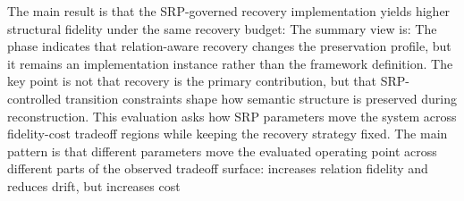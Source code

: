 {}
\markdownRendererSectionEnd \markdownRendererSectionBegin
{}\markdownRendererInterblockSeparator
{}The main result is that the SRP-governed recovery implementation yields higher structural fidelity under the same recovery budget:\markdownRendererInterblockSeparator
{}\markdownRendererInterblockSeparator
{}The summary view is:\markdownRendererInterblockSeparator
{}\markdownRendererInterblockSeparator
{}
\markdownRendererSectionEnd \markdownRendererSectionBegin
{}\markdownRendererInterblockSeparator
{}The phase indicates that relation-aware recovery changes the preservation profile, but it remains an implementation instance rather than the framework definition. The key point is not that recovery is the primary contribution, but that SRP-controlled transition constraints shape how semantic structure is preserved during reconstruction.\markdownRendererInterblockSeparator
{}
\markdownRendererSectionEnd 
\markdownRendererSectionEnd \markdownRendererSectionBegin
{}\markdownRendererInterblockSeparator
{}This evaluation asks how SRP parameters move the system across fidelity-cost tradeoff regions while keeping the recovery strategy fixed.\markdownRendererParagraphSeparator
{}The main pattern is that different parameters move the evaluated operating point across different parts of the observed tradeoff surface:\markdownRendererInterblockSeparator
{}\markdownRendererUlBeginTight
\markdownRendererUlItem {} increases relation fidelity and reduces drift, but increases cost\markdownRendererUlItemEnd 
